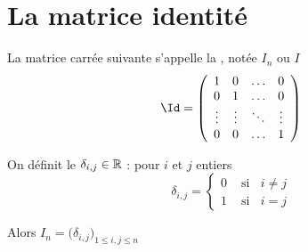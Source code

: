 % 
% 
% 
% 
% 
% 
% 
% 
% 

\section{La matrice identité}

\begin{frame}

La matrice carrée suivante s'appelle la , notée $I_n$ ou $I$
 \[
 \Id = \left(
 \begin{array}{cccc}
1 & 0 & \dots & 0\\
0& 1& \dots & 0\\
 \vdots& \vdots & \ddots  & \vdots\\
0 & 0 & \dots &1
\end{array}
\right)
 \]

\bigskip

\pause
On définit le  $\delta_{i,j}\in \mathbb{R}$ : pour $i$ et $j$ entiers
$$\delta_{i,j}=\begin{cases}
0 & \text{ si } \;\; i\neq j \\
1 & \text{ si } \;\; i=j
\end{cases}$$

\pause
\bigskip

\centerline{Alors $I_{n}=\Big(\delta_{i,j}\Big)_{1\leq i,j \leq n}$ }



\end{frame}

